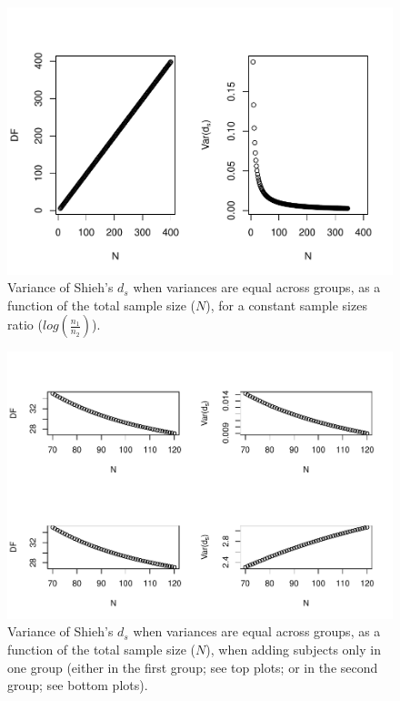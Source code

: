 \documentclass[
  english,
  man]{apa6}
\begin{document}
\begin{figure}
\centering
\includegraphics{Theoretical-Variance-of-all-estimators-as-a-function-of-population-parameters_files/figure-latex/varshiehhomNsize2-1.pdf}
\caption{\label{fig:varshiehhomNsize2}Variance of Shieh's \(d_s\) when variances are equal across groups, as a function of the total sample size (\(N\)), for a constant sample sizes ratio (\(log\left(\frac{n_1}{n_2} \right)\)).}
\end{figure}

\begin{figure}
\centering
\includegraphics{Theoretical-Variance-of-all-estimators-as-a-function-of-population-parameters_files/figure-latex/varshiehhomNsize4-1.pdf}
\caption{\label{fig:varshiehhomNsize4}Variance of Shieh's \(d_s\) when variances are equal across groups, as a function of the total sample size (\(N\)), when adding subjects only in one group (either in the first group; see top plots; or in the second group; see bottom plots).}
\end{figure}
\end{document}
